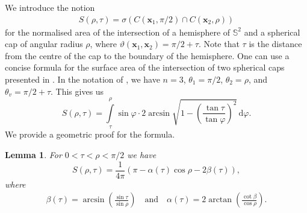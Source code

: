 \documentclass[a4paper,11pt]{amsart}
\newtheorem{lemma}{Lemma}
\begin{document}
We introduce the notion
\begin{align*}
    S(\rho,\tau)=\sigma\left(C(\mathbf{x}_1,\pi/2)\cap C(\mathbf{x}_2,\rho)\right)
\end{align*}
for the normalised area of the intersection of a hemisphere of $\mathbb{S}^2$ and a spherical cap of angular radius $\rho$, where $\vartheta(\mathbf{x}_1,\mathbf{x}_2)=\pi/2+\tau$. Note that $\tau$ is the distance from the centre of the cap to the boundary of the hemisphere. One can use a concise formula for the surface area of the intersection of two spherical caps presented in \cite{Lee_Kim}. In the notation of \cite{Lee_Kim}, we have $n=3$, $\theta_1=\pi/2$, $\theta_2=\rho$, and $\theta_v=\pi/2+\tau$. This gives us 
    \begin{equation*}
         S(\rho,\tau)=\int\limits_{\tau}^\rho\sin\varphi\cdot 2\arcsin\sqrt{1-\left(\frac{\tan \tau}{\tan \varphi}\right)^2}\, \mathrm{d}\varphi. 
    \end{equation*}
We provide a geometric proof for the formula.
\begin{lemma}\label{geometric_proof_formula}
    For $0<\tau<\rho<\pi/2$ we have
    \begin{equation*}
       S(\rho,\tau)=\frac{1}{4\pi}\left(\pi-\alpha(\tau)\cos\rho-2\beta(\tau)\right),
    \end{equation*}
    where \begin{align}\label{alpha and beta}
    \beta(\tau) =\arcsin\left(\frac{\sin \tau}{\sin \rho}\right)\quad \text{and}\quad
    \alpha(\tau) =2\arctan\left( \frac{\cot \beta}{\cos\rho}\right).
\end{align}
\end{lemma}
\end{document}

